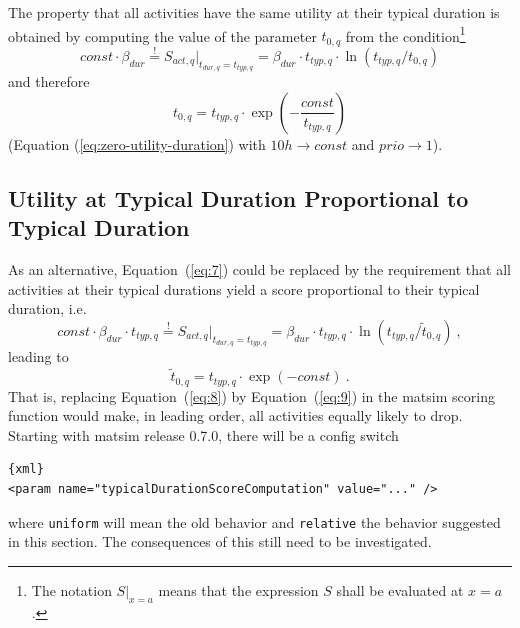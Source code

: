 The property that all activities have the same utility at their typical duration is obtained by computing the value of the parameter $t_{0,q}$ from the condition\footnote{%
%
The notation $S \Big|_{x=a}$ means that the expression $S$ shall be evaluated at $x=a$.
%
}
\begin{equation}
const \cdot \beta_{dur} \stackrel!= S_{act,q} \Big|_{t_{dur,q} = t_{typ,q}}
=
\beta_{dur} \cdot t_{typ,q} \cdot \ln(t_{typ,q}/t_{0,q}) 
\label{eq:7}
\end{equation}
and therefore
\begin{equation}
t_{0,q} = t_{typ,q} \cdot \exp\left( - \frac{const}{t_{typ,q}} \right)
\label{eq:8}
\end{equation}
(\cf Equation (\ref{eq:zero-utility-duration}) with $10h \to const$ and $prio \to 1$). 

\subsection{Utility at Typical Duration Proportional to Typical Duration}

As an alternative, Equation~(\ref{eq:7}) could be replaced by the requirement that all activities at their typical durations yield a score proportional to their typical duration, i.e.\
\begin{equation}
const \cdot \beta_{dur} \cdot t_{typ,q} \stackrel!= S_{act,q} \Big|_{t_{dur,q} = t_{typ,q}}
=
\beta_{dur} \cdot t_{typ,q} \cdot \ln(t_{typ,q}/\tilde t_{0,q}) \ , 
\end{equation}
leading to
\begin{equation}
\tilde t_{0,q} = t_{typ,q} \cdot \exp( - const ) \ .
\label{eq:9}
\end{equation}
That is, replacing Equation~(\ref{eq:8}) by Equation~(\ref{eq:9}) in the \gls{matsim} scoring function would make, in leading order, all activities equally likely to drop.  Starting with \gls{matsim} release 0.7.0, there will be a config switch 
\begin{lstlisting}{xml}
<param name="typicalDurationScoreComputation" value="..." />
\end{lstlisting}
where \lstinline{uniform} will mean the old behavior and \lstinline{relative} the behavior suggested in this section.  The consequences of this still need to be investigated.



